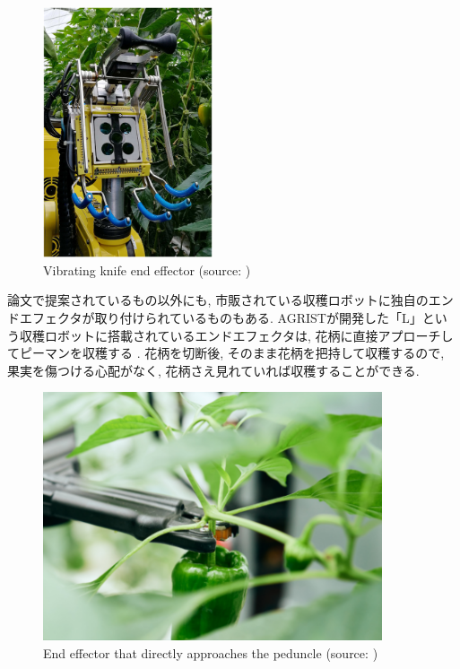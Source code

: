 \vspace{5mm}
\begin{figure}[H]
     \centering
     \includegraphics[width=50mm]{images/png/sweeper.png}
     \caption[Vibrating knife end effector]{Vibrating knife end effector (source: \cite{sweeper})}
     \label{Fig:sweeper}
\end{figure}

論文で提案されているもの以外にも, 市販されている収穫ロボットに独自のエンドエフェクタが取り付けられているものもある.
AGRISTが開発した「L」という収穫ロボットに搭載されているエンドエフェクタは, 花柄に直接アプローチしてピーマンを収穫する \cite{agrist}.
花柄を切断後, そのまま花柄を把持して収穫するので, 果実を傷つける心配がなく, 花柄さえ見れていれば収穫することができる.

\vspace{5mm}
\begin{figure}[H]
     \centering
     \includegraphics[width=100mm]{images/png/agrist.png}
     \caption[End effector that directly approaches the peduncle]{End effector that directly approaches the peduncle (source: \cite{agrist})}
     \label{Fig:agrist}
\end{figure}

